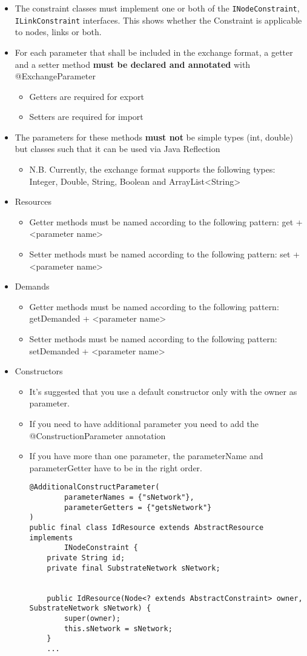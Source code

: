 \begin{itemize}
	\item The constraint classes must implement one or both of the \texttt{INodeConstraint}, \texttt{ILinkConstraint} interfaces. This shows whether the Constraint is applicable to nodes, links or both.
	\item For each parameter that shall be included in the exchange format, a getter and a setter method \textbf{must be declared and  annotated} with @ExchangeParameter 
	\begin{itemize}
		\item Getters are required for export
		\item Setters are required for import
	\end{itemize}
	\item The parameters for these methods \textbf{must not} be simple types (int, double) but classes 
	such that it can be used via Java Reflection
	\begin{itemize}
		\item N.B.  Currently, the exchange format supports the following types: Integer, Double, String, Boolean and ArrayList<String>
	\end{itemize}
	\item Resources
	\begin{itemize}
		\item Getter methods must be named according to the following pattern: get + <parameter name>
		\item Setter methods must be named according to the following pattern: set + <parameter name>
	\end{itemize}
	\item Demands
	\begin{itemize}
		\item Getter methods must be named according to the following pattern: getDemanded + <parameter name>
		\item Setter methods must be named according to the following pattern: setDemanded + <parameter name>
	\end{itemize}
	\item Constructors
	\begin{itemize}
		\item It's suggested that you use a default constructor only with the owner as parameter.
		\item If you need to have additional parameter you need to add the @ConstructionParameter annotation
		\item If you have more than one parameter, the parameterName and parameterGetter have to be in the right order.
		\begin{lstlisting}
@AdditionalConstructParameter(
		parameterNames = {"sNetwork"},
		parameterGetters = {"getsNetwork"}
)
public final class IdResource extends AbstractResource implements
		INodeConstraint {
	private String id;
	private final SubstrateNetwork sNetwork;


	public IdResource(Node<? extends AbstractConstraint> owner, SubstrateNetwork sNetwork) {
		super(owner);
		this.sNetwork = sNetwork;
	}
	...
		\end{lstlisting}
	\end{itemize}
\end{itemize}


